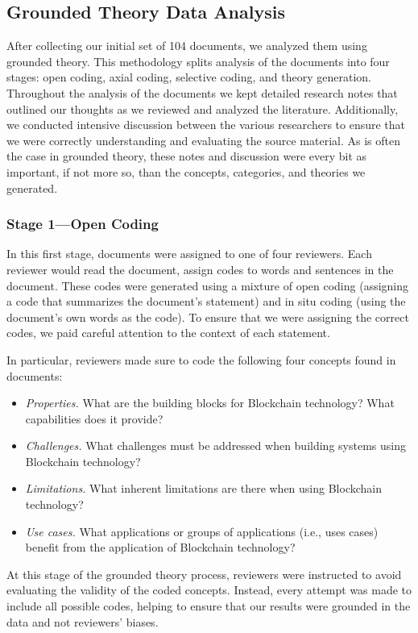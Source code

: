 \subsection{Grounded Theory Data Analysis}
After collecting our initial set of 104 documents, we analyzed them using grounded theory.
This methodology splits analysis of the documents into four stages: open coding, axial coding, selective coding, and theory generation.
Throughout the analysis of the documents we kept detailed research notes that outlined our thoughts as we reviewed and analyzed the literature.
Additionally, we conducted intensive discussion between the various researchers to ensure that we were correctly understanding and evaluating the source material.
As is often the case in grounded theory, these notes and discussion were every bit as important, if not more so, than the concepts, categories, and theories we generated.

\subsubsection{Stage 1---Open Coding}
In this first stage, documents were assigned to one of four reviewers.
Each reviewer would read the document, assign codes to words and sentences in the document.
These codes were generated using a mixture of open coding (assigning a code that summarizes the document's statement) and in situ coding (using the document's own words as the code).
To ensure that we were assigning the correct codes, we paid careful attention to the context of each statement.

In particular, reviewers made sure to code the following four concepts found in documents:
\begin{itemize}
	\item \emph{Properties.} What are the building blocks for Blockchain technology? What capabilities does it provide?
	\item \emph{Challenges.} What challenges must be addressed when building systems using Blockchain technology?
	\item \emph{Limitations.} What inherent limitations are there when using Blockchain technology?
	\item \emph{Use cases.} What applications or groups of applications (i.e., uses cases) benefit from the application of Blockchain technology?
\end{itemize}

At this stage of the grounded theory process, reviewers were instructed to avoid evaluating the validity of the coded concepts.
Instead, every attempt was made to include all possible codes, helping to ensure that our results were grounded in the data and not reviewers' biases.

